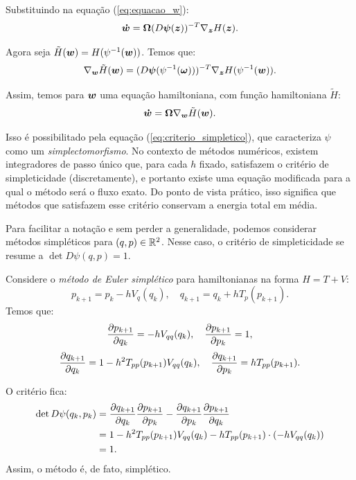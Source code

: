 Substituindo na equação (\ref{eq:equacao_w}):
\begin{equation}
  \bm {\dot w} = \bm \Omega (D \bm \psi(\bm z))^{-T} \nabla_{\bm z} H(\bm z).
\end{equation}

Agora seja $\tilde H(\bm w) = H(\psi^{-1}(\bm w))$. Temos que:
\begin{equation}
  \nabla_{\bm w} \tilde H(\bm w) = (D \bm \psi(\psi^{-1}(\bm \omega)))^{-T} \nabla_{\bm z} H(\psi^{-1}(\bm w)).
\end{equation}

Assim, temos para $\bm w$ uma equação hamiltoniana, com função hamiltoniana $\tilde H$:
\begin{equation}
  \bm {\dot w} = \bm \Omega \nabla_{\bm w} \tilde H(\bm w).
\end{equation}

Isso é possibilitado pela equação (\ref{eq:criterio_simpletico}), que caracteriza $\psi$ como um \textit{simplectomorfismo}. No contexto de métodos numéricos, existem integradores de passo único que, para cada $h$ fixado, satisfazem o critério de simpleticidade (discretamente), e portanto existe uma equação modificada para a qual o método será o fluxo exato. Do ponto de vista prático, isso significa que métodos que satisfazem esse critério conservam a energia total em média.

Para facilitar a notação e sem perder a generalidade, podemos considerar métodos simpléticos para $(q,p) \in \mathbb{R}^2$. Nesse caso, o critério de simpleticidade se resume a $\det{D \psi(q, p)} = 1$.

\begin{example}
Considere o \textit{método de Euler simplético} para hamiltonianas na forma $H = T + V$:
\begin{equation}
  p_{k+1} = p_k - h V_{q} (q_k), 
  \quad
  q_{k+1} = q_k + h T_{p} (p_{k+1}). 
\end{equation}
Temos que:
\begin{equation*}
  \dfrac{\partial p_{k+1}}{\partial q_k} = - h V_{qq} (q_k),
  \quad
  \dfrac{\partial p_{k+1}}{\partial p_k} = 1,
\end{equation*}
\begin{equation*}
  \dfrac{\partial q_{k+1}}{\partial q_k} = 1 - h^2 T_{pp} (p_{k+1}) V_{qq} (q_k),
  \quad
  \dfrac{\partial q_{k+1}}{\partial p_k} = h T_{pp} (p_{k+1}).
\end{equation*}

O critério fica:
\begin{align}
  \det{D \psi(q_k, p_k)} &= \dfrac{\partial q_{k+1}}{\partial q_k} \dfrac{\partial p_{k+1}}{\partial p_k} - \dfrac{\partial q_{k+1}}{\partial p_k} \dfrac{\partial p_{k+1}}{\partial q_k} \nonumber \\
  &= 1 - h^2 T_{pp} (p_{k+1}) V_{qq} (q_k) - h T_{pp} (p_{k+1}) \cdot (- h V_{qq} (q_k)) \nonumber \\
  &= 1.
\end{align}
Assim, o método é, de fato, simplético.
\end{example}

